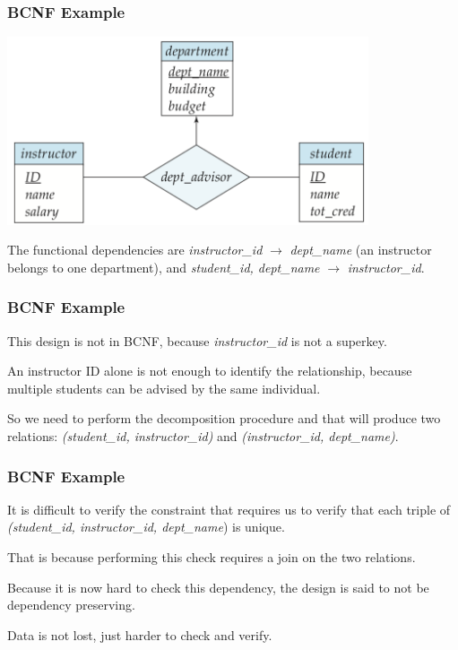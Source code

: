 \begin{frame}
\frametitle{BCNF Example}

\begin{center}
\includegraphics[width=0.8\textwidth]{images/advise-3}
\end{center}

The functional dependencies are \textit{instructor\_id} $\rightarrow$ \textit{dept\_name} (an instructor belongs to one department), and \textit{student\_id, dept\_name} $\rightarrow$ \textit{instructor\_id}.


\end{frame}



\begin{frame}
\frametitle{BCNF Example}

This design is not in BCNF, because \textit{instructor\_id} is not a superkey.

An instructor ID alone is not enough to identify the relationship, because multiple students can be advised by the same individual. 

So we need to perform the decomposition procedure and that will produce two relations: \textit{(student\_id, instructor\_id)} and \textit{(instructor\_id, dept\_name)}.

\end{frame}



\begin{frame}
\frametitle{BCNF Example}

It is difficult to verify the constraint that requires us to verify that each triple of \textit{(student\_id, instructor\_id, dept\_name}) is unique. 

That is because performing this check requires a join on the two relations. 

Because it is now hard to check this dependency, the design is said to not be \alert{dependency preserving}. 

Data is not lost, just harder to check and verify.

\end{frame}

